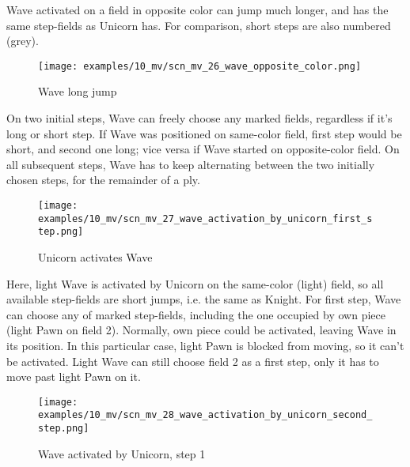 Wave activated on a field in opposite color can jump much longer, and has the same step-fields
as Unicorn has. For comparison, short steps are also numbered (grey).

\vspace*{0.7\baselineskip}
\noindent
\begin{wrapfigure}[18]{l}{0.7\textwidth}
\centering
\texttt{[image: examples/10\_mv/scn\_mv\_26\_wave\_opposite\_color.png]}
\vspace*{-0.3\baselineskip}
\caption{Wave long jump}
\label{fig:scn_mv_26_wave_opposite_color}
\end{wrapfigure}
On two initial steps, Wave can freely choose any marked fields, regardless if it's long or short step.
If Wave was positioned on same-color field, first step would be short, and second one long; vice versa
if Wave started on opposite-color field. On all subsequent steps, Wave has to keep alternating between
the two initially chosen steps, for the remainder of a ply.

\clearpage %

\vspace*{-2.1\baselineskip}
\noindent
\begin{figure}[!h]
\texttt{[image: examples/10\_mv/scn\_mv\_27\_wave\_activation\_by\_unicorn\_first\_step.png]}
\vspace*{-1.3\baselineskip}
\caption{Unicorn activates Wave}
\label{fig:scn_mv_27_wave_activation_by_unicorn_first_step}
\end{figure}

\vspace*{-0.3\baselineskip}
Here, light Wave is activated by Unicorn on the same-color (light) field, so all available
step-fields are short jumps, i.e. the same as Knight. For first step, Wave can choose any of
marked step-fields, including the one occupied by own piece (light Pawn on field 2). Normally,
own piece could be activated, leaving Wave in its position. In this particular case, light Pawn
is blocked from moving, so it can't be activated. Light Wave can still choose field 2 as a first
step, only it has to move past light Pawn on it.

\clearpage %

\vspace*{-2.1\baselineskip}
\noindent
\begin{figure}[!h]
\texttt{[image: examples/10\_mv/scn\_mv\_28\_wave\_activation\_by\_unicorn\_second\_step.png]}
\caption{Wave activated by Unicorn, step 1}
\label{fig:scn_mv_28_wave_activation_by_unicorn_second_step}
\end{figure}

